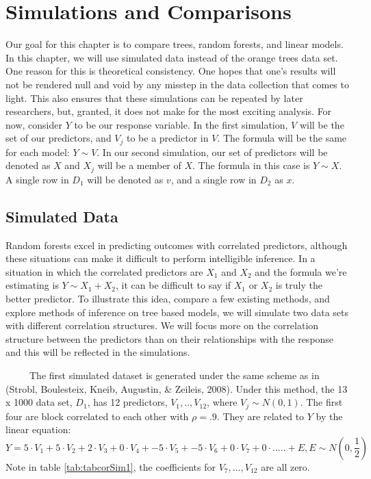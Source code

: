 \documentclass[12pt,twoside]{reedthesis}
\begin{document}
  \chapter{Simulations and Comparisons}\label{simulations-and-comparisons}
  
  Our goal for this chapter is to compare trees, random forests, and
  linear models. In this chapter, we will use simulated data instead of
  the orange trees data set. One reason for this is theoretical
  consistency. One hopes that one's results will not be rendered null and
  void by any misstep in the data collection that comes to light. This
  also ensures that these simulations can be repeated by later
  researchers, but, granted, it does not make for the most exciting
  analysis. For now, consider \(Y\) to be our response variable. In the
  first simulation, \(V\) will be the set of our predictors, and \(V_j\)
  to be a predictor in \(V\). The formula will be the same for each model:
  \(Y \sim V\). In our second simulation, our set of predictors will be
  denoted as \(X\) and \(X_j\) will be a member of \(X\). The formula in
  this case is \(Y \sim X\). A single row in \(D_1\) will be denoted as
  \(v\), and a single row in \(D_2\) as \(x\).
  
  \section{Simulated Data}\label{simulated-data}
  
  Random forests excel in predicting outcomes with correlated predictors,
  although these situations can make it difficult to perform intelligible
  inference. In a situation in which the correlated predictors are \(X_1\)
  and \(X_2\) and the formula we're estimating is \(Y \sim X_1 + X_2\), it
  can be difficult to say if \(X_1\) or \(X_2\) is truly the better
  predictor. To illustrate this idea, compare a few existing methods, and
  explore methods of inference on tree based models, we will simulate two
  data sets with different correlation structures. We will focus more on
  the correlation structure between the predictors than on their
  relationships with the response and this will be reflected in the
  simulations.
  
  ~~~~~The first simulated dataset is generated under the same scheme as
  in (Strobl, Boulesteix, Kneib, Augustin, \& Zeileis, 2008). Under this
  method, the 13 x 1000 data set, \(D_1\), has 12 predictors,
  \(V_1,..,V_{12}\), where \(V_j \sim N(0,1)\). The first four are block
  correlated to each other with \(\rho = .9\). They are related to \(Y\)
  by the linear equation:
  \[Y = 5 \cdot V_1 + 5 \cdot V_2 + 2 \cdot V_3 + 0 \cdot V_4 + -5 \cdot V_5 + -5\cdot V_6 + 0\cdot V_7 + 0 \cdot ..... + E, E \sim N(0,\frac 1 2 )\]
  Note in table \ref{tab:tabcorSim1}, the coefficients for
  \(V_7,...,V_{12}\) are all zero.
  
\end{document}
